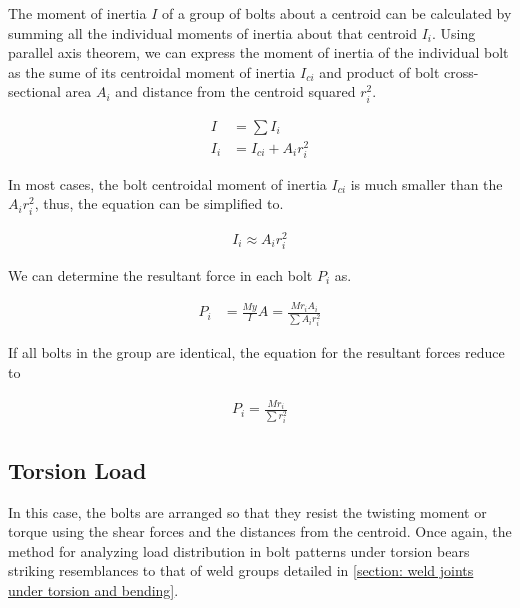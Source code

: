 \documentclass[
10pt,
a4paper,
openany,
svgnames,
]{book}
\begin{document}
The moment of inertia $I$ of a group of bolts about a centroid can be calculated by summing all the individual moments of inertia about that centroid $I_i$. Using parallel axis theorem, we can express the moment of inertia of the individual bolt as the sume of its centroidal moment of inertia $I_{ci}$ and product of bolt cross-sectional area $A_i$ and distance from the centroid squared $r_i^2$.

\begin{align}
  \label{eq: moment of inertia of bolts}
  I &= \sum I_i \\
  I_i &= I_{ci} + A_ir_i^2 %
\end{align}

In most cases, the bolt centroidal moment of inertia $I_{ci}$ is much smaller than the $A_ir_i^2$, thus, the equation can be simplified to.

\begin{align}
  I_i \approx A_ir_i^2
\end{align}

We can determine the resultant force in each bolt $P_i$ as.

\begin{align}
  P_i &= \frac{My}{I}A = \frac{Mr_iA_i}{\sum A_ir_i^2} 
\end{align}

If all bolts in the group are identical, the equation for the resultant forces reduce to

\begin{align}
  \label{eq: reduced bolts under bending}
  P_i = \frac{Mr_i}{\sum r_i^2}
\end{align}

\subsection{Torsion Load}

In this case, the bolts are arranged so that they resist the twisting moment or torque using the shear forces and the distances from the centroid. Once again, the method for analyzing load distribution in bolt patterns under torsion bears striking resemblances to that of weld groups detailed in \cref{section: weld joints under torsion and bending}.
\end{document}
